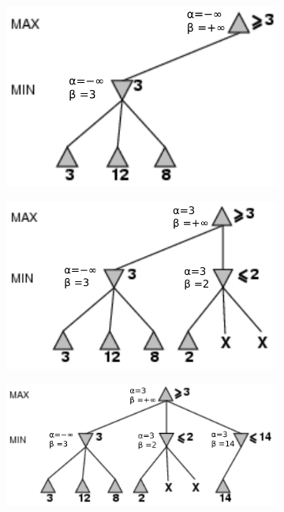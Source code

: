 \begin{figure}[h]
    \begin{subfigure}{.3\textwidth}
        \centering
        \includegraphics[width=\linewidth]{img/alphabeta_algo_example1.png}
    \end{subfigure}
    \begin{subfigure}{.3\textwidth}
        \centering
        \includegraphics[width=\linewidth]{img/alphabeta_algo_example2.png}
    \end{subfigure}
    \begin{subfigure}{.4\textwidth}
        \centering
        \includegraphics[width=\linewidth]{img/alphabeta_algo_example3.png}

\end{subfigure}
\end{figure}
